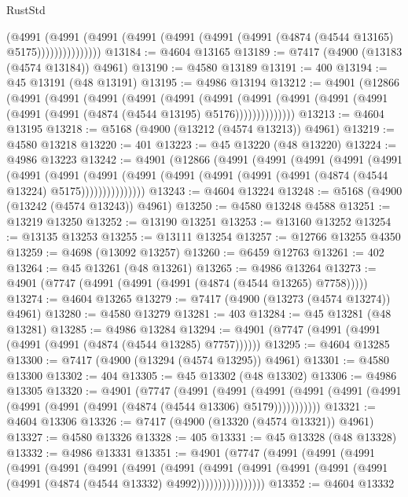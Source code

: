 \begin{lexlean}{RustStd}
\begin{coremodule}
                  (@4991
                    (@4991
                      (@4991 (@4991 (@4991 (@4991 (@4991 (@4874 (@4544 @13165) @5175)))))))))))))))
@13184 := @4604 @13165
@13189 := @7417 (@4900 (@13183 (@4574 @13184)) @4961)
@13190 := @4580 @13189
@13191 := 400
@13194 := @45 @13191 (@48 @13191)
@13195 := @4986 @13194
@13212 := @4901
    (@12866
      (@4991
        (@4991
          (@4991
            (@4991
              (@4991
                (@4991
                  (@4991
                    (@4991 (@4991 (@4991 (@4991 (@4991 (@4874 (@4544 @13195) @5176))))))))))))))
@13213 := @4604 @13195
@13218 := @5168 (@4900 (@13212 (@4574 @13213)) @4961)
@13219 := @4580 @13218
@13220 := 401
@13223 := @45 @13220 (@48 @13220)
@13224 := @4986 @13223
@13242 := @4901
    (@12866
      (@4991
        (@4991
          (@4991
            (@4991
              (@4991
                (@4991
                  (@4991
                    (@4991
                      (@4991 (@4991 (@4991 (@4991 (@4991 (@4874 (@4544 @13224) @5175)))))))))))))))
@13243 := @4604 @13224
@13248 := @5168 (@4900 (@13242 (@4574 @13243)) @4961)
@13250 := @4580 @13248 @4588
@13251 := @13219 @13250
@13252 := @13190 @13251
@13253 := @13160 @13252
@13254 := @13135 @13253
@13255 := @13111 @13254
@13257 := @12766 @13255 @4350
@13259 := @4698 (@13092 @13257)
@13260 := @6459 @12763
@13261 := 402
@13264 := @45 @13261 (@48 @13261)
@13265 := @4986 @13264
@13273 := @4901 (@7747 (@4991 (@4991 (@4991 (@4874 (@4544 @13265) @7758)))))
@13274 := @4604 @13265
@13279 := @7417 (@4900 (@13273 (@4574 @13274)) @4961)
@13280 := @4580 @13279
@13281 := 403
@13284 := @45 @13281 (@48 @13281)
@13285 := @4986 @13284
@13294 := @4901 (@7747 (@4991 (@4991 (@4991 (@4991 (@4874 (@4544 @13285) @7757))))))
@13295 := @4604 @13285
@13300 := @7417 (@4900 (@13294 (@4574 @13295)) @4961)
@13301 := @4580 @13300
@13302 := 404
@13305 := @45 @13302 (@48 @13302)
@13306 := @4986 @13305
@13320 := @4901
    (@7747
      (@4991
        (@4991
          (@4991 (@4991 (@4991 (@4991 (@4991 (@4991 (@4991 (@4874 (@4544 @13306) @5179)))))))))))
@13321 := @4604 @13306
@13326 := @7417 (@4900 (@13320 (@4574 @13321)) @4961)
@13327 := @4580 @13326
@13328 := 405
@13331 := @45 @13328 (@48 @13328)
@13332 := @4986 @13331
@13351 := @4901
    (@7747
      (@4991
        (@4991
          (@4991
            (@4991
              (@4991
                (@4991
                  (@4991
                    (@4991
                      (@4991
                        (@4991
                          (@4991 (@4991 (@4991 (@4991 (@4874 (@4544 @13332) @4992))))))))))))))))
@13352 := @4604 @13332

\end{coremodule}
\end{lexlean}
